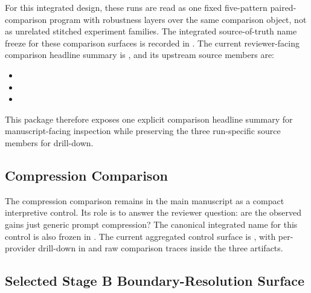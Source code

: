 \documentclass[11pt,a4paper]{article}
\begin{document}
For this integrated design, these runs are read as one fixed five-pattern paired-comparison program with robustness layers over the same comparison object, not as unrelated stitched experiment families. The integrated source-of-truth name freeze for these comparison surfaces is recorded in . The current reviewer-facing comparison headline summary is , and its upstream source members are:
\begin{itemize}
  \item {}
  \item {}
  \item {}
\end{itemize}
This package therefore exposes one explicit comparison headline summary for manuscript-facing inspection while preserving the three run-specific source members for drill-down.

\subsection{Compression Comparison}

The compression comparison remains in the main manuscript as a compact interpretive control. Its role is to answer the reviewer question: are the observed gains just generic prompt compression? The canonical integrated name for this control is also frozen in . The current aggregated control surface is , with per-provider drill-down in  and raw comparison traces inside the three  artifacts.

\subsection{Selected Stage B Boundary-Resolution Surface}
\end{document}
